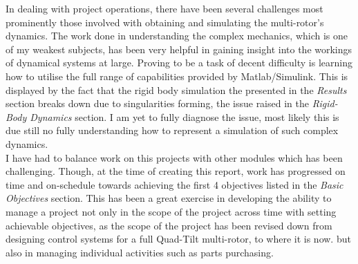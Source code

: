 \documentclass[12pt,a4paper,twoside]{report}
\begin{document}
		In dealing with project operations, there have been several challenges most prominently those involved with obtaining and simulating the multi-rotor's dynamics. The work done in understanding the complex mechanics, which is one of my weakest subjects, has been very helpful in gaining insight into the workings of dynamical systems at large. Proving to be a task of decent difficulty is learning how to utilise the full range of capabilities provided by Matlab/Simulink. This is displayed by the fact that the rigid body simulation the presented in the \emph{Results} section breaks down due to singularities forming, the issue raised in the \emph{Rigid-Body Dynamics} section. I am yet to fully diagnose the issue, most likely this is due still no fully understanding how to represent a simulation of such complex dynamics.
		\\	   
		I have had to balance work on this projects with other modules which has been challenging. Though, at the time of creating this report, work has progressed on time and on-schedule towards achieving the first 4 objectives listed in the \emph{Basic Objectives} section. This has been a great exercise in developing the ability to manage a project not only in the scope of the project across time with setting achievable objectives, as the scope of the project has been revised down from designing control systems for a full Quad-Tilt multi-rotor, to where it is now.  but also in managing individual activities such as parts purchasing.
		
		
	\newpage
	
\end{document}

